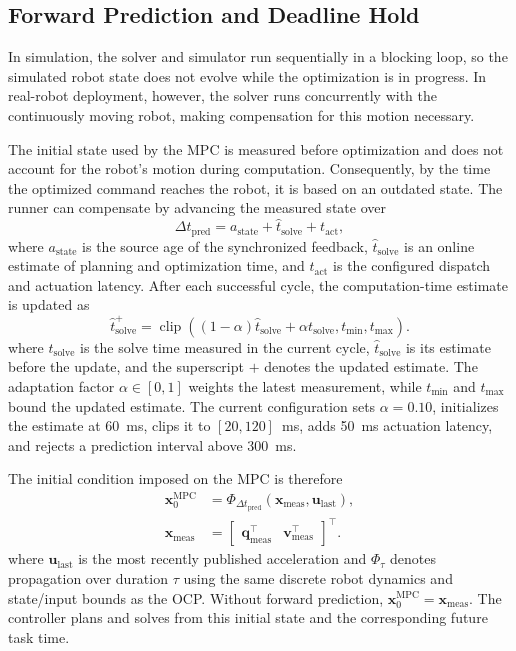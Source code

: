 \documentclass[conference]{IEEEtran}
\newcommand{\vect}[1]{\boldsymbol{#1}}
\begin{document}
\subsection{Forward Prediction and Deadline Hold}

In simulation, the solver and simulator run sequentially in a blocking loop,
so the simulated robot state does not evolve while the optimization is in
progress.  In real-robot deployment, however, the solver runs concurrently
with the continuously moving robot, making compensation for this motion
necessary.

The initial state used by the MPC is measured before optimization and does not
account for the robot's motion during computation.  Consequently, by the time
the optimized command reaches the robot, it is based on an outdated state.  The
runner can compensate by advancing the measured state over
\begin{equation}
\Delta t_{\mathrm{pred}}
 = a_{\mathrm{state}}+\hat{t}_{\mathrm{solve}}+t_{\mathrm{act}},
\label{eq:forward-prediction-time}
\end{equation}
where $a_{\mathrm{state}}$ is the source age of the synchronized feedback,
$\hat{t}_{\mathrm{solve}}$ is an online estimate of planning and optimization
time, and $t_{\mathrm{act}}$ is the configured dispatch and actuation latency.
After each successful cycle, the computation-time estimate is updated as
\begin{equation}
\hat{t}_{\mathrm{solve}}^{+}
=\operatorname{clip}\!\left((1-\alpha)\hat{t}_{\mathrm{solve}}
+\alpha t_{\mathrm{solve}},t_{\min},t_{\max}\right).
\label{eq:solver-time-adaptation}
\end{equation}
where $t_{\mathrm{solve}}$ is the solve time measured in the current cycle,
$\hat{t}_{\mathrm{solve}}$ is its estimate before the update, and the superscript
$+$ denotes the updated estimate.  The adaptation factor $\alpha\in[0,1]$
weights the latest measurement, while $t_{\min}$ and $t_{\max}$ bound the
updated estimate.  The current configuration sets $\alpha=0.10$, initializes
the estimate at 60~ms, clips it to $[20,120]$~ms, adds 50~ms actuation latency,
and rejects a prediction interval above 300~ms.

The initial condition imposed on the MPC is therefore
\begin{align}
\vect{x}_{0}^{\mathrm{MPC}}
&=\Phi_{\Delta t_{\mathrm{pred}}}
 \!\left(\vect{x}_{\mathrm{meas}},\vect{u}_{\mathrm{last}}\right),
\label{eq:mpc-predicted-initial-state}\\
\vect{x}_{\mathrm{meas}}
&=\begin{bmatrix}\vect{q}_{\mathrm{meas}}^{\top}&
\vect{v}_{\mathrm{meas}}^{\top}\end{bmatrix}^{\!\top}.
\nonumber
\end{align}
where $\vect{u}_{\mathrm{last}}$ is the most recently published acceleration and
$\Phi_{\tau}$ denotes propagation over duration $\tau$ using the same discrete
robot dynamics and state/input bounds as the OCP.  Without forward prediction,
$\vect{x}_{0}^{\mathrm{MPC}}=\vect{x}_{\mathrm{meas}}$.  The controller plans and
solves from this initial state and the corresponding future task time.
\end{document}
